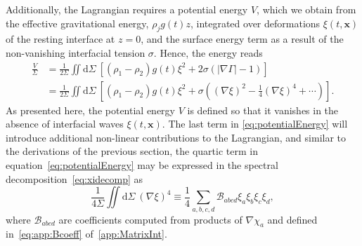 \documentclass[a4paper]{jpconf}
\newcommand{\dd}{\mathrm{d}}
\begin{document}
Additionally, the Lagrangian requires a potential energy $V$, which we obtain from the effective gravitational energy, $\rho_j g(t)z$, integrated over deformations $\xi(t,\bm{x})$ of the resting interface at $z=0$, and the surface energy term as a result of the non-vanishing interfacial tension $\sigma$. Hence, the energy reads
\begin{equation}
    \label{eq:potentialEnergy}
\begin{aligned}    
    \frac{V}{\Sigma} &= \frac{1}{2\Sigma}\iint\dd\Sigma~\left[\left(\rho_1-\rho_2\right)g(t)\xi^2+2\sigma\left(|\nabla\Gamma|-1\right)\right]\\
    &=\frac{1}{2\Sigma}\iint\dd\Sigma~\left[\left(\rho_1-\rho_2\right)g(t)\xi^2+\sigma\left((\nabla\xi)^2-\frac{1}{4}(\nabla\xi)^4+\cdots\right)\right].
\end{aligned}
\end{equation}
As presented here, the potential energy $V$ is defined so that it vanishes in the absence of interfacial waves $\xi(t,\bm{x})$. The last term in \eqref{eq:potentialEnergy} will introduce additional non-linear contributions to the Lagrangian, and similar to the derivations of the previous section, the quartic term in equation~\eqref{eq:potentialEnergy} may be expressed in the spectral decomposition~\eqref{eq:xidecomp} as
\begin{equation}
    \frac{1}{4\Sigma}\iint\dd\Sigma~(\nabla\xi)^4\equiv \frac{1}{4}\sum_{a,b,c,d}\mathcal{B}_{abcd}\xi_a\xi_b\xi_c\xi_d,
\end{equation}
where $\mathcal{B}_{abcd}$ are coefficients computed from products of $\nabla\chi_a$ and defined in~\eqref{eq:app:Bcoeff} of~\ref{app:MatrixInt}.
\end{document}
